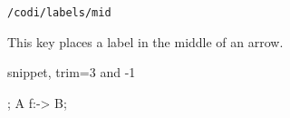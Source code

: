 \begin{lstlisting}[style=metacode]
/codi/labels/mid
\end{lstlisting}

This key places a label in the middle of an arrow.

\begin{tcblisting}{snippet, trim={3 and -1}}
\begin{codi}
;
\mor [mid] A f:-> B;
\end{codi}
\end{tcblisting}
